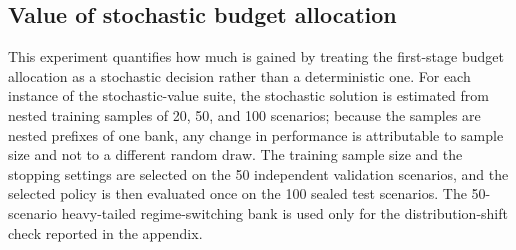 \documentclass[authoryear,final,3p,times]{elsarticle}
\theoremstyle{definition}
\theoremstyle{plain}
\begin{document}
\begin{table}[!htbp]
\centering
\caption{Comparison with external benchmark methods on the comparison suite.}
\label{tab:e2_external}
\end{table}

\begin{table}[!htbp]
\centering
\caption{Contribution of individual mechanisms on the comparison suite.}
\label{tab:e2_internal}
\end{table}

\subsection{Value of stochastic budget allocation}
\label{subsec:e3_stochastic_value}

This experiment quantifies how much is gained by treating the first-stage
budget allocation as a stochastic decision rather than a deterministic one.
For each instance of the stochastic-value suite, the stochastic solution is
estimated from nested training samples of 20, 50, and 100 scenarios; because
the samples are nested prefixes of one bank, any change in performance is
attributable to sample size and not to a different random draw.  The training
sample size and the stopping settings are selected on the 50 independent
validation scenarios, and the selected policy is then evaluated once on the
100 sealed test scenarios.  The 50-scenario heavy-tailed regime-switching
bank is used only for the distribution-shift check reported in the appendix.
\end{document}

